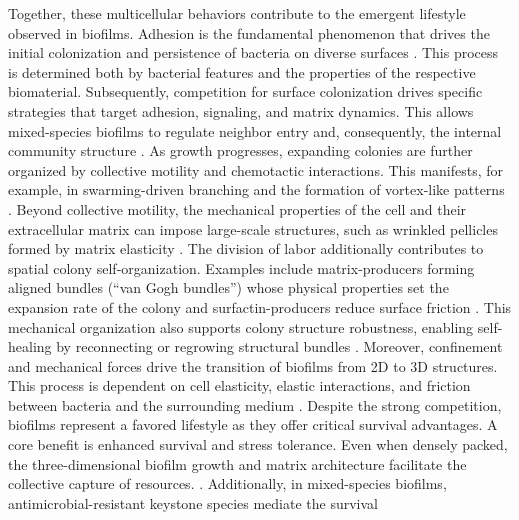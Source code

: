 Together, these multicellular behaviors contribute to the emergent lifestyle observed in biofilms.
Adhesion is the fundamental phenomenon that drives the initial colonization and
persistence of bacteria on diverse surfaces \cite{Dunne2002, Ong1999, vanLoosdrecht1989,
Hori2010}. This process is determined both by bacterial features and the properties of
the respective biomaterial.
Subsequently, competition for surface colonization drives specific strategies that target
adhesion, signaling, and matrix dynamics. This allows mixed-species biofilms to regulate
neighbor entry and, consequently, the internal community structure \cite{Rendueles2012}.
As growth progresses, expanding colonies are further organized by collective motility and
chemotactic interactions. This manifests, for example, in swarming-driven branching and
the formation of vortex-like patterns \cite{Ingham2008}. Beyond collective motility, the
mechanical properties of the cell and their extracellular matrix can impose large-scale
structures, such as wrinkled pellicles formed by matrix elasticity \cite{Trejo2013}. The
division of labor additionally contributes to spatial colony self-organization. Examples
include matrix-producers forming aligned bundles (“van Gogh bundles”) whose physical
properties set the expansion rate of the colony and surfactin-producers reduce surface
friction \cite{Li2025, vanGestel2015, Lopez2010, Flemming2016}. This mechanical
organization also supports colony structure robustness, enabling self-healing by
reconnecting or regrowing structural bundles \cite{Dong2022}. Moreover, confinement and
mechanical forces drive the transition of biofilms from 2D to 3D structures. This process
is dependent on cell elasticity, elastic interactions, and friction between bacteria and
the surrounding medium \cite{Duvernoy2018, Grant2014}.
Despite the strong competition, biofilms represent a favored lifestyle as they offer
critical survival advantages. A core benefit is enhanced survival and stress tolerance.
Even when densely packed, the three-dimensional biofilm growth and matrix architecture
facilitate the collective capture of resources. \cite{Nadell2017, Arjes2021}.
Additionally, in mixed-species biofilms, antimicrobial-resistant keystone species mediate
the survival \cite{Wisnu2022, Flemming2016}

